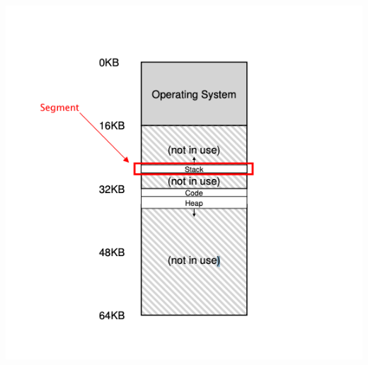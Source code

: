 \documentclass[12pt]{article}
\begin{document}
\begin{enumerate}[1.]
\begin{itemize}
\begin{itemize}
            \begin{center}
            \includegraphics[width=0.7\linewidth]{images/worksheet_8_solution_2.png}
            \end{center}
        \end{itemize}
    \end{itemize}


\end{enumerate}
\end{document}
